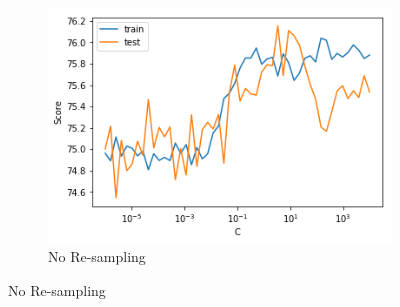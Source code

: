 \begin{figure}[h]
    \centering
    \begin{subfigure}{0.5\textwidth}
        \centering
        \caption{No Re-sampling}
        \includegraphics[width=1\textwidth]{Figures/no_resampling.png}
    \end{subfigure}%
    

\end{figure}
